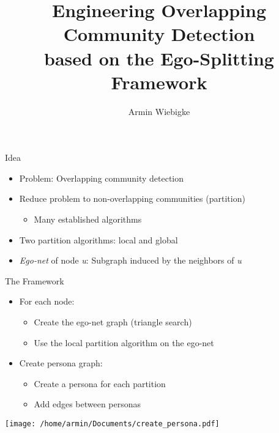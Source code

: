 \documentclass[11pt]{beamer}
\begin{document}
	\author{Armin Wiebigke}
	\title[Ego-Splitting Framework]{Engineering Overlapping Community Detection\\ based on the Ego-Splitting Framework}
	\begin{frame}[plain]
	\maketitle
\end{frame}

\begin{frame}{Idea}
\begin{itemize}
	\item Problem: Overlapping community detection
	\item Reduce problem to non-overlapping communities (partition)
	\begin{itemize}
		\item Many established algorithms
	\end{itemize}
	\item Two partition algorithms: local and global
	\item \emph{Ego-net} of node \textit{u}: Subgraph induced by the neighbors of \textit{u}
\end{itemize}
\end{frame}


\begin{frame}{The Framework}
\begin{itemize}
	 \item For each node:
	 \begin{itemize}
	 	\item Create the ego-net graph (triangle search)
	 	\item Use the local partition algorithm on the ego-net
	 \end{itemize}
	 \item Create persona graph:
	 \begin{itemize}
	 	\item Create a persona for each partition
	 	\item Add edges between personas
	 \end{itemize}
\end{itemize}
\vfill
\centering
\texttt{[image: /home/armin/Documents/create\_persona.pdf]}
\end{frame}
\end{document}
